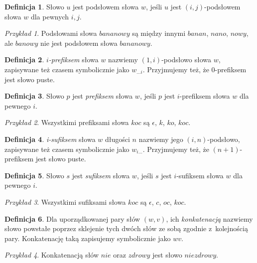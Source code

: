 \documentclass[declaration,shortabstract]{iithesis}
\theoremstyle{definition} \newtheorem{definition}{Definicja}[chapter]
\theoremstyle{remark} \newtheorem{remark}[definition]{Obserwacja}
\theoremstyle{plain} \newtheorem{theorem}[definition]{Twierdzenie}
\theoremstyle{remark} \newtheorem{example}{Przykład}[definition]
\theoremstyle{plain} \newtheorem{lemma}[definition]{Lemat}
\begin{document}
\begin{definition}
    Słowo $u$ jest podsłowem słowa $w$, jeśli $u$ jest $(i, j)$-podsłowem słowa $w$ dla pewnych $i, j$.
\end{definition}

\begin{example}
    Podsłowami słowa $bananowy$ są między innymi $banan$, $nano$, $nowy$, ale $banowy$ nie jest podsłowem słowa $bananowy$.
\end{example}

\begin{definition}
    \textit{$i$-prefiksem} słowa $w$ nazwiemy $(1, i)$-podsłowo słowa $w$, zapisywane też czasem symbolicznie jako $w_{\ldots i}$. Przyjmujemy też, że $0$-prefiksem jest słowo puste.
\end{definition}

\begin{definition}
    Słowo $p$ jest \textit{prefiksem} słowa $w$, jeśli $p$ jest $i$-prefiksem słowa $w$ dla pewnego $i$.
\end{definition}

\begin{example}
    Wszystkimi prefiksami słowa $koc$ są $\epsilon$, $k$, $ko$, $koc$.
\end{example}

\begin{definition}
    \textit{i-sufiksem} słowa $w$ długości $n$ nazwiemy jego $(i, n)$-podsłowo, zapisywane też czasem symbolicznie jako $w_{i \ldots}$. Przyjmujemy też, że $(n+1)$-prefiksem jest słowo puste.
\end{definition}

\begin{definition}
    Słowo $s$ jest \textit{sufiksem} słowa $w$, jeśli $s$ jest $i$-sufiksem słowa $w$ dla pewnego $i$.
\end{definition}

\begin{example}
    Wszystkimi sufiksami słowa $koc$ są $\epsilon$, $c$, $oc$, $koc$.
\end{example}

\begin{definition}
    Dla uporządkowanej pary słów $(w, v)$, ich \textit{konkatenacją} nazwiemy słowo powstałe poprzez sklejenie tych dwóch słów ze sobą zgodnie z~kolejnością pary. Konkatenację taką zapisujemy symbolicznie jako $wv$.
\end{definition}

\begin{example}
    Konkatenacją słów $nie$ oraz $zdrowy$ jest słowo $niezdrowy$.
\end{example}
\end{document}
